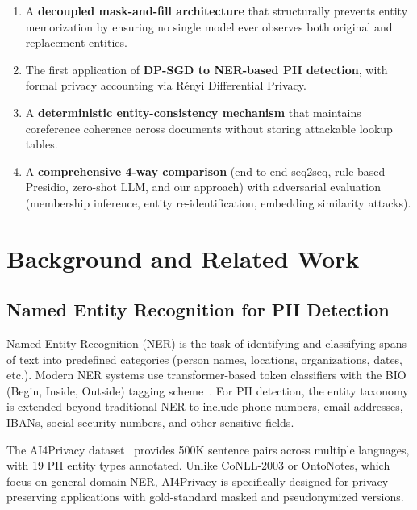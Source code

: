 \documentclass[11pt, a4paper]{article}
\begin{document}
\begin{enumerate}[leftmargin=*]
  \item A \textbf{decoupled mask-and-fill architecture} that
        structurally prevents entity memorization by ensuring no single
        model ever observes both original and replacement entities.
  \item The first application of \textbf{DP-SGD to NER-based PII
        detection}, with formal privacy accounting via R\'{e}nyi
        Differential Privacy.
  \item A \textbf{deterministic entity-consistency mechanism} that
        maintains coreference coherence across documents without
        storing attackable lookup tables.
  \item A \textbf{comprehensive 4-way comparison} (end-to-end seq2seq,
        rule-based Presidio, zero-shot LLM, and our approach) with
        adversarial evaluation (membership inference, entity
        re-identification, embedding similarity attacks).
\end{enumerate}


\section{Background and Related Work}
\label{sec:related}

\subsection{Named Entity Recognition for PII Detection}

Named Entity Recognition (NER) is the task of identifying and classifying
spans of text into predefined categories (person names, locations,
organizations, dates, etc.).  Modern NER systems use transformer-based
token classifiers with the BIO (Begin, Inside, Outside) tagging
scheme~\cite{he2021debertav3}.  For PII detection, the entity taxonomy
is extended beyond traditional NER to include phone numbers, email
addresses, IBANs, social security numbers, and other sensitive fields.

The AI4Privacy dataset~\cite{pilán2022ai4privacy} provides 500K
sentence pairs across multiple languages, with 19 PII entity types
annotated.  Unlike CoNLL-2003 or OntoNotes, which focus on general-domain
NER, AI4Privacy is specifically designed for privacy-preserving
applications with gold-standard masked and pseudonymized versions.
\end{document}
